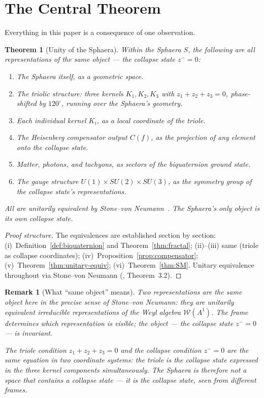 \documentclass[12pt,a4paper]{article}
\newtheorem{theorem}{Theorem}[section]
\newtheorem*{remark}{Remark}
\newcommand{\zminus}{z^-}
\newcommand{\WA}{\mathcal{W}(A^1)}
\begin{document}
\clearpage

\section{The Central Theorem}
\label{sec:central}

Everything in this paper is a consequence of one observation.

\begin{theorem}[Unity of the Sphaera]\label{thm:unity}
Within the Sphaera $S$, the following are all representations of the
same object --- the collapse state $\zminus=0$:
\begin{enumerate}[label=(\roman*)]
  \item The Sphaera itself, as a geometric space.
  \item The triolic structure: three kernels $K_1,K_2,K_3$ with
        $z_1+z_2+z_3=0$, phase-shifted by $120^\circ$, running over the
        Sphaera's geometry.
  \item Each individual kernel $K_i$, as a local coordinate of the triole.
  \item The Heisenberg compensator output $C(f)$, as the projection of
        any element onto the collapse state.
  \item Matter, photons, and tachyons, as sectors of the biquaternion
        ground state.
  \item The gauge structure $U(1)\times SU(2)\times SU(3)$, as the
        symmetry group of the collapse state's representations.
\end{enumerate}
All are unitarily equivalent by Stone--von Neumann~\cite{brendecke2026rh}.
The Sphaera's only object is its own collapse state.
\end{theorem}

\begin{proof}[Proof structure]
The equivalences are established section by section:
(i)~Definition~\ref{def:biquaternion} and Theorem~\ref{thm:fractal};
(ii)--(iii) same (triole as collapse coordinates);
(iv)~Proposition~\ref{prop:compensator};
(v)~Theorem~\ref{thm:unitary-equiv};
(vi)~Theorem~\ref{thm:SM}.
Unitary equivalence throughout via Stone--von Neumann
(\cite{brendecke2026rh}, Theorem~3.2).
\end{proof}

\begin{remark}[What ``same object'' means]
Two representations are the same object here in the precise sense of
Stone--von Neumann: they are unitarily equivalent irreducible
representations of the Weyl algebra $\WA$.
The frame determines which representation is visible; the object ---
the collapse state $\zminus=0$ --- is invariant.

The triole condition $z_1+z_2+z_3=0$ and the collapse condition
$\zminus=0$ are the same equation in two coordinate systems: the triole
is the collapse state expressed in the three kernel components
simultaneously.
The Sphaera is therefore not a space that contains a collapse state ---
it \emph{is} the collapse state, seen from different frames.
\end{remark}
\end{document}
